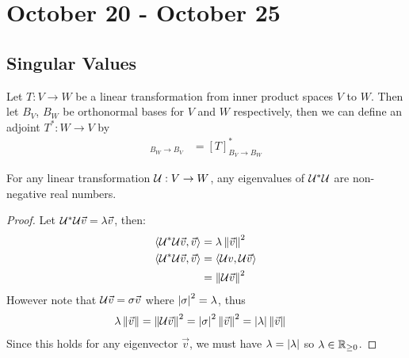 \chapter{October 20 - October 25}

\section{Singular Values}

\begin{remark}
  Let $T : V \to W$ be a linear transformation from inner product spaces $V$ to $W$.
  Then let $B_V$, $B_W$ be orthonormal bases for $V$ and $W$ respectively, then we can define an adjoint $T^* : W \to V$ by
    \begin{align}
      [T^*]_{B_W \to B_V} &= [T]_{B_V \to B_W}^*
    \end{align}
\end{remark}

\begin{lemma}\label{ustarueigenvalues}
  For any linear transformation $\mathcal{U} : V \to W$, any eigenvalues of $\mathcal{U}^*\mathcal{U}$ are non-negative real numbers.
\end{lemma}
\begin{proof}
  Let $\mathcal{U}^*\mathcal{U}\vec v = \lambda\vec v$, then:
    \begin{align}
      \left\langle \mathcal{U}^*\mathcal{U} \vec v , \vec v \right\rangle &= \lambda\left\lVert\vec v\right\rVert^2 \\
      \left\langle \mathcal{U}^*\mathcal{U} \vec v , \vec v \right\rangle &= \left\langle \mathcal{U} v , \mathcal{U} \vec v \right\rangle \\
        &= \left\lVert\mathcal{U}\vec v\right\rVert^2
    \end{align}
  However note that $\mathcal{U}\vec v = \sigma \vec v$ where $\left|\sigma\right|^2 = \lambda$, thus
    \begin{align}
      \lambda\left\lVert\vec v\right\rVert &= \left\lVert\mathcal{U} \vec v\right\rVert^2 = \left|\sigma\right|^2\left\lVert\vec v\right\rVert^2 = \left|\lambda\right|\left\lVert\vec v\right\rVert
    \end{align}
  Since this holds for any eigenvector $\vec v$, we must have $\lambda = \left|\lambda\right|$ so $\lambda \in \mathbb{R}_{\ge 0}$.
\end{proof}

